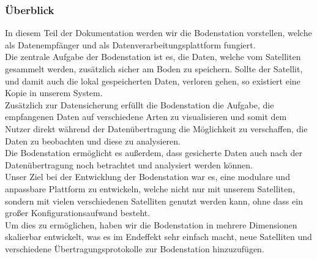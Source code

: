 \subsubsection{Überblick}
In diesem Teil der Dokumentation werden wir die Bodenstation vorstellen, welche als Datenempfänger und als Datenverarbeitungsplattform fungiert. \\
Die zentrale Aufgabe der Bodenstation ist es, die Daten, welche vom Satelliten gesammelt werden, zusätzlich sicher am Boden zu speichern. Sollte der Satellit, und damit auch die lokal gespeicherten Daten, verloren gehen, so existiert eine Kopie in unserem System. \\
Zusätzlich zur Datensicherung erfüllt die Bodenstation die Aufgabe, die empfangenen Daten auf verschiedene Arten zu visualisieren und somit dem Nutzer direkt während der Datenübertragung die Möglichkeit zu verschaffen, die Daten zu beobachten und diese zu analysieren. \\
Die Bodenstation ermöglicht es außerdem, dass gesicherte Daten auch nach der Datenübertragung noch betrachtet und analysiert werden können. \\
Unser Ziel bei der Entwicklung der Bodenstation war es, eine modulare und anpassbare Plattform zu entwickeln, welche nicht nur mit unserem Satelliten, sondern mit vielen verschiedenen Satelliten genutzt werden kann, ohne dass ein großer Konfigurationsaufwand besteht. \\
Um dies zu ermöglichen, haben wir die Bodenstation in mehrere Dimensionen skalierbar entwickelt, was es im Endeffekt sehr einfach macht, neue Satelliten und verschiedene Übertragungsprotokolle zur Bodenstation hinzuzufügen.